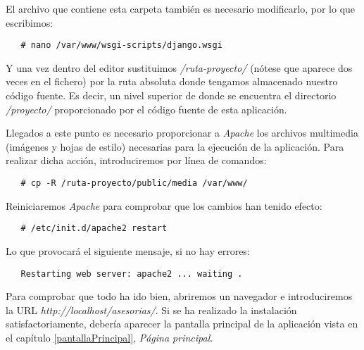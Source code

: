    El archivo que contiene esta carpeta también es necesario modificarlo, por
   lo que escribimos:

   \begin{verbatim}
   # nano /var/www/wsgi-scripts/django.wsgi
   \end{verbatim}

   Y una vez dentro del editor sustituimos \textit{/ruta-proyecto/} (nótese que
   aparece dos veces en el fichero) por la ruta absoluta donde tengamos
   almacenado nuestro código fuente. Es decir, un nivel superior de donde se
   encuentra el directorio \textit{/proyecto/} proporcionado por el código
   fuente de esta aplicación.

   Llegados a este punto es necesario proporcionar a \textit{Apache} los
   archivos multimedia (imágenes y hojas de estilo) necesarias para la ejecución
   de la aplicación. Para realizar dicha acción, introduciremos por línea de
   comandos:

   \begin{verbatim}
   # cp -R /ruta-proyecto/public/media /var/www/
   \end{verbatim}

   Reiniciaremos \textit{Apache} para comprobar que los cambios han tenido
   efecto:

   \begin{verbatim}
   # /etc/init.d/apache2 restart
   \end{verbatim}

   Lo que provocará el siguiente mensaje, si no hay errores:

   \begin{verbatim}
   Restarting web server: apache2 ... waiting .
   \end{verbatim}

   Para comprobar que todo ha ido bien, abriremos un navegador e introduciremos
   la URL \textit{http://localhost/asesorias/}. Si se ha realizado la
   instalación satisfactoriamente, debería aparecer la pantalla principal
   de la aplicación vista en el capítulo \ref{pantallaPrincipal},
   \textit{Página principal}.